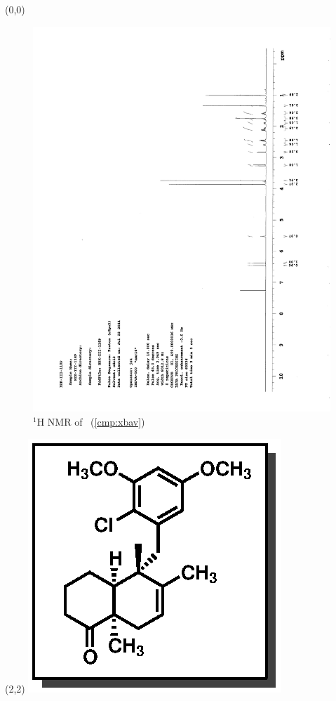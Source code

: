 \begin{textblock}{20}(0,0)
\begin{figure}[htb]
\caption{$^1$H NMR of \CMPxbav\ (\ref{cmp:xbav})}
\includegraphics[scale=0.75, trim = 0mm 0mm 0mm 5mm,
clip]{chp_singlecarbon/images/nmr/xbavH}
\vspace{-100pt}
\end{figure}
\end{textblock}
\begin{textblock}{1}(2,2)
\includegraphics[scale=0.8, angle=90]{chp_singlecarbon/images/xbav}
\end{textblock}
